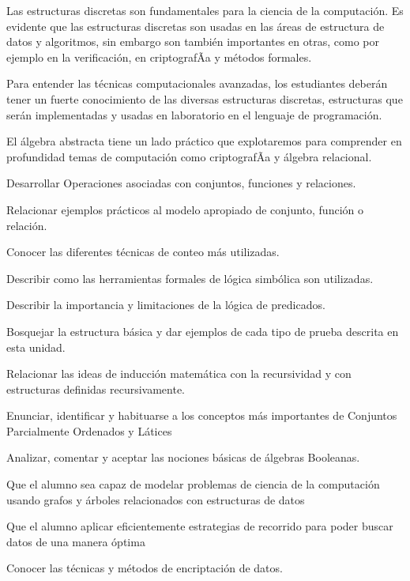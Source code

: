 \begin{syllabus}


\begin{justification}
Las estructuras discretas son fundamentales para la ciencia de la computación. Es evidente que las estructuras discretas son usadas en las áreas de estructura de datos y algoritmos, sin embargo son también importantes en otras, como por ejemplo en la verificación, en criptografÃ­a y métodos formales.

Para entender las técnicas computacionales avanzadas, los estudiantes deberán tener un fuerte conocimiento de las diversas estructuras discretas, estructuras que serán implementadas y usadas en laboratorio en el lenguaje de programación.

El álgebra abstracta tiene un lado práctico que explotaremos para comprender en profundidad temas de computación como criptografÃ­a y álgebra relacional.
\end{justification}

\begin{goals}
\item Desarrollar Operaciones asociadas con conjuntos, funciones y relaciones.
\item Relacionar ejemplos prácticos al modelo apropiado de conjunto, función o relación.
\item Conocer las diferentes técnicas de conteo más utilizadas.
\item Describir como las herramientas formales de lógica simbólica son utilizadas.
\item Describir la importancia y limitaciones de la lógica de predicados.
\item Bosquejar la estructura básica y dar ejemplos de cada tipo de prueba descrita en esta unidad.
\item Relacionar las ideas de inducción matemática con la recursividad y con estructuras definidas recursivamente.
\item Enunciar, identificar y habituarse a los conceptos más importantes de Conjuntos Parcialmente Ordenados y Látices
\item Analizar, comentar y aceptar las nociones básicas de álgebras Booleanas.
\item Que el alumno sea capaz de modelar problemas de ciencia de la computación usando grafos y árboles relacionados con estructuras de datos
\item Que el alumno aplicar eficientemente estrategias de recorrido para poder buscar datos de una manera óptima
\item Conocer las técnicas y métodos de encriptación de datos.
\end{goals}


\end{syllabus}
